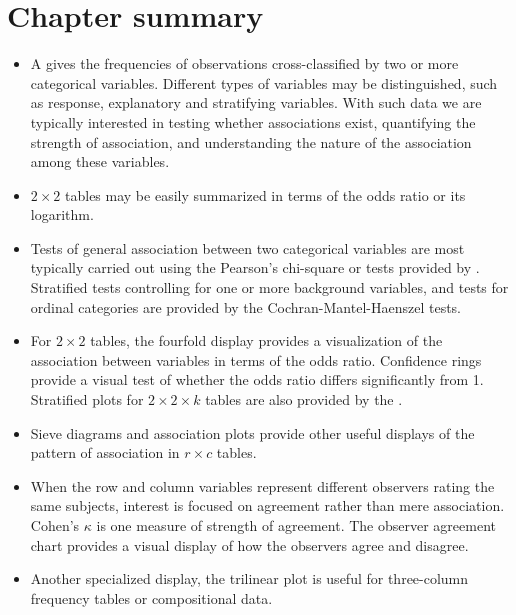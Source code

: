 \section{Chapter summary}
\begin{itemize}
  \item A \ctab{} gives the frequencies of observations
  cross-classified by two or more categorical variables.
  Different types of variables may be distinguished, such as
  response, explanatory and stratifying variables.
  With such data we are typically interested in testing whether
  associations exist, quantifying the strength of association,
  and understanding the nature of the association among these
  variables.

  \item $2 \times 2$ tables may be easily summarized in terms of
  the odds ratio or its logarithm.

  \item Tests of general association between two categorical variables are
  most typically carried out using the Pearson's chi-square or
  \LR{} tests provided by .
  Stratified tests controlling for one or more background variables, and
  tests for ordinal categories are provided by the
  Cochran-Mantel-Haenszel tests.

  \item For $2 \times 2$ tables, the fourfold display provides a
  visualization of the association between variables in terms of
  the odds ratio.  Confidence rings provide a visual test of
  whether the odds ratio differs significantly from 1. Stratified
  plots for $2 \times 2 \times k$ tables are also provided by the .


  \item Sieve diagrams and association plots provide other useful displays of the pattern of association
  in $r \times c$ tables.

  \item When the row and column variables represent different
  observers rating the same subjects, interest is focused on
  agreement rather than mere association.  Cohen's $\kappa$ is one
  measure of strength of agreement.  The observer agreement chart
  provides a visual display of how the observers agree and
  disagree.

  \item Another specialized display, the trilinear plot is useful
  for three-column frequency tables or compositional data.
\end{itemize}
